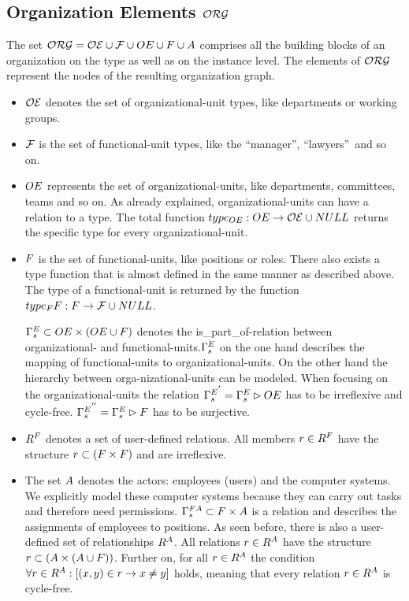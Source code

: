 \subsection{Organization Elements $\mathcal{ORG}$}
	The set $\mathcal{ORG} = \mathcal{OE} \cup \mathcal{F} \cup OE \cup F \cup A $ comprises all the building blocks of an organization on the type as well as on the instance level. The elements of $\mathcal{ORG}$ represent the nodes of the resulting organization graph.

	\begin{itemize}

	\item $\mathcal{OE}$ denotes the set of organizational-unit types, like departments or working groups.

	\item $\mathcal{F}$ is the set of functional-unit types, like the ``manager'', ``lawyers''\ and so on.

	\item $OE$ represents the set of organizational-units, like departments, committees, teams and so on. As already explained, organizational-units can have a relation to a type. The total function $type_{OE}: OE \rightarrow \mathcal{OE} \cup NULL$ returns the specific type for every organizational-unit.

	\item $F$ is the set of functional-units, like positions or roles. There also exists a type function that is almost defined in the same manner as described above. The type of a functional-unit is returned by the function $type_F{F}: F \rightarrow \mathcal{F} \cup NULL$.

	$\relstrukturOE_F \subset \oe \times (\oe \cup \f)$ denotes the is\_part\_of-relation between organizational- and functional-units.$\relstrukturOE_F$ on the one hand	describes the mapping of functional-units to organizational-units. On the	other hand the hierarchy between orga-nizational-units can be modeled. When focusing on the organizational-units the relation ${\relstrukturOE_F}^{'} = \relstrukturOE_F \rhd \oe$ has to be irreflexive and cycle-free. ${\relstrukturOE_F}^{''} = \relstrukturOE_F \rhd \f$ has to be surjective.

	\item  $R^{F}$ denotes a set of user-defined relations. All members $r \in R^{F}$ have the structure $r \subset (F \times F)$ and	are irreflexive.

	\item The set $A$ denotes the actors: employees (users) and the computer systems. We explicitly model these computer systems because they can carry out tasks and therefore need permissions. ${\Gamma}^{FA}_{s} \subset F \times A$ is a relation and describes the assignments of employees to positions. As seen before, there is also a user-defined set of relationships $R^{A}$. All relations $r \in R^{A}$ have the structure $r \subset (A \times (A \cup F))$. Further on, for all $r \in R^{A}$ the condition $\forall r \in R^{A}: \left[(x,y) \in r \rightarrow x \neq y \right]$ holds, meaning that every relation	$r \in R^{A}$ is cycle-free.


\end{itemize}
